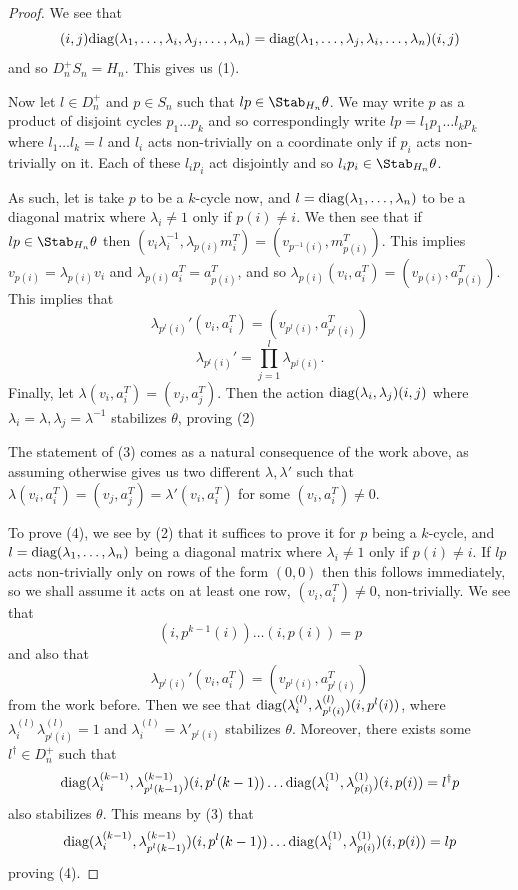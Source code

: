 \documentclass[11pt,letterpaper]{amsart}
\begin{document}
\begin{proof}
    \par We see that 
    $$
    (i, j)\textup{diag}(\lambda_1, \ldots, \lambda_i, \lambda_j, \ldots, \lambda_n) = \textup{diag}(\lambda_1, \ldots, \lambda_j, \lambda_i, \ldots, \lambda_n) (i, j)
    $$
    and so $D_n^+S_n = H_n$. This gives us (1).
    \par Now let $l\in D_n^+$ and $p\in S_n$ such that $lp\in \Stab_{H_n}\theta$. We may write $p$ as a product of disjoint cycles $p_1\ldots p_k$ and so correspondingly write $lp = l_1p_1\ldots l_kp_k$ where $l_1\ldots l_k = l$ and $l_i$ acts non-trivially on a coordinate only if $p_i$ acts non-trivially on it. Each of these $l_ip_i$ act disjointly and so $l_ip_i\in\Stab_{H_n}\theta$. 
    \par As such, let is take $p$ to be a $k$-cycle now, and $l = \textup{diag}(\lambda_1, \ldots, \lambda_n)$ to be a diagonal matrix where $\lambda_i\neq 1$ only if $p(i)\neq i$. We then see that if $lp\in\Stab_{H_n}\theta$ then $(v_i\lambda_{i}^{-1}, \lambda_{p(i)}m^T_i) = (v_{p^{-1}(i)}, m^T_{p(i)})$. This implies $v_{p(i)}=\lambda_{p(i)}v_i$ and $\lambda_{p(i)}a^T_i=a_{p(i)}^T$, and so $\lambda_{p(i)}(v_i, a_i^T) = (v_{p(i)}, a_{p(i)}^T)$. This implies that 
    $$
    \lambda_{p^l(i)}'(v_i, a_i^T) = (v_{p^l(i)}, a_{p^l(i)}^T)
    $$
    $$
    \lambda_{p^l(i)}'=\prod_{j=1}^l\lambda_{p^j(i)}.
    $$
    Finally, let $\lambda (v_i, a_i^T) = (v_j, a_j^T)$. Then the action $\textup{diag}(\lambda_i, \lambda_j)(i, j)$ where $\lambda_i = \lambda, \lambda_j = \lambda^{-1}$ stabilizes $\theta$, proving (2)
    \par The statement of (3) comes as a natural consequence of the work above, as assuming otherwise gives us two different $\lambda, \lambda'$ such that $\lambda(v_i, a_i^T) = (v_j, a_j^T) =\lambda'(v_i, a_i^T)$ for some $(v_i, a_i^T)\neq 0$.
    \par To prove (4), we see by (2) that it suffices to prove it for $p$ being a $k$-cycle, and $l = \textup{diag}(\lambda_1, \ldots, \lambda_n)$ being a diagonal matrix where $\lambda_i\neq 1$ only if $p(i)\neq i$. If $lp$ acts non-trivially only on rows of the form $(0, 0)$ then this follows immediately, so we shall assume it acts on at least one row, $(v_i, a_i^T)\neq 0$, non-trivially. We see that
    $$
    (i, p^{k-1}(i))\ldots (i, p(i)) = p
    $$
    and also that 
    $$
    \lambda_{p^l(i)}'(v_i, a_i^T) = (v_{p^l(i)}, a_{p^l(i)}^T)
    $$
    from the work before. Then we see that $\textup{diag}(\lambda^{(l)}_i, \lambda^{(l)}_{p^l(i)})(i, p^l(i))$, where $\lambda^{(l)}_i \lambda^{(l)}_{p^l(i)}=1$ and $\lambda^{(l)}_i  = \lambda'_{p^l(i)}$ stabilizes $\theta$. Moreover, there exists some $l^\dagger\in D_n^+$ such that
    $$
    \textup{diag}(\lambda^{(k-1)}_i, \lambda^{(k-1)}_{p^l(k-1)})(i, p^l(k-1))\ldots \textup{diag}(\lambda^{(1)}_i, \lambda^{(1)}_{p(i)})(i, p(i)) = l^\dagger p
    $$
    also stabilizes $\theta$. This means by (3) that
    $$
    \textup{diag}(\lambda^{(k-1)}_i, \lambda^{(k-1)}_{p^l(k-1)})(i, p^l(k-1))\ldots \textup{diag}(\lambda^{(1)}_i, \lambda^{(1)}_{p(i)})(i, p(i)) = l p
    $$
    proving (4). 
\end{proof}
\end{document}
